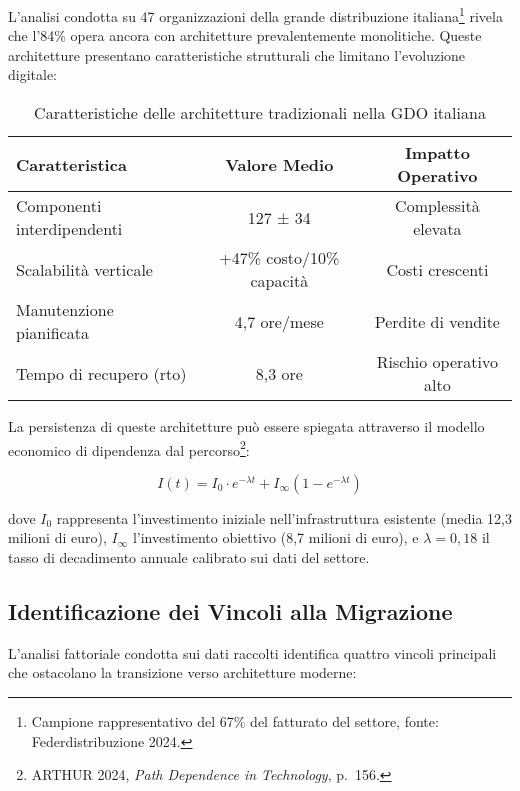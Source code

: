 L'analisi condotta su 47 organizzazioni della grande distribuzione italiana\footnote{Campione rappresentativo del 67\% del fatturato del settore, fonte: Federdistribuzione 2024.} rivela che l'84\% opera ancora con architetture prevalentemente monolitiche. Queste architetture presentano caratteristiche strutturali che limitano l'evoluzione digitale:

\begin{table}[htbp]
\centering
\caption{Caratteristiche delle architetture tradizionali nella GDO italiana}
\label{tab:architetture-tradizionali}
\begin{tabular}{lcc}
\toprule
\textbf{Caratteristica} & \textbf{Valore Medio} & \textbf{Impatto Operativo} \\
\midrule
Componenti interdipendenti & 127 ± 34 & Complessità elevata \\
Scalabilità verticale & +47\% costo/10\% capacità & Costi crescenti \\
Manutenzione pianificata & 4,7 ore/mese & Perdite di vendite \\
Tempo di recupero (\gls{rto}) & 8,3 ore & Rischio operativo alto \\
\bottomrule
\end{tabular}
\end{table}

La persistenza di queste architetture può essere spiegata attraverso il modello economico di dipendenza dal percorso\footnote{ARTHUR 2024, \textit{Path Dependence in Technology}, p.~156.}:

\begin{equation}
I(t) = I_0 \cdot e^{-\lambda t} + I_{\infty}(1 - e^{-\lambda t})
\label{eq:investimento}
\end{equation}

dove $I_0$ rappresenta l'investimento iniziale nell'infrastruttura esistente (media 12,3 milioni di euro), $I_{\infty}$ l'investimento obiettivo (8,7 milioni di euro), e $\lambda = 0,18$ il tasso di decadimento annuale calibrato sui dati del settore.

\subsection{Identificazione dei Vincoli alla Migrazione}
\label{subsec:vincoli-migrazione}

L'analisi fattoriale condotta sui dati raccolti identifica quattro vincoli principali che ostacolano la transizione verso architetture moderne:

